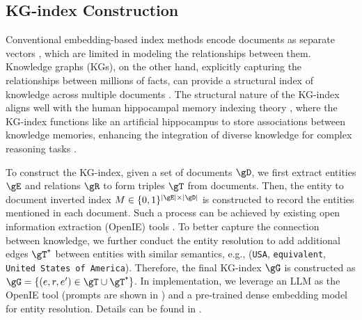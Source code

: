 

\subsection{KG-index Construction}\label{sec:kg-construction}
Conventional embedding-based index methods encode documents as separate vectors \citep{karpukhin2020dense,bge_m3,moreira2024nv}, which are limited in modeling the relationships between them. Knowledge graphs (KGs), on the other hand, explicitly capturing the relationships between millions of facts, can provide a structural index of knowledge across multiple documents \citep{edge2024local,gutiérrez2024hipporag}. The structural nature of the KG-index aligns well with the human hippocampal memory indexing theory \citep{teyler1986hippocampal}, where the KG-index functions like an artificial hippocampus to store associations between knowledge memories, enhancing the integration of diverse knowledge for complex reasoning tasks \citep{gutiérrez2024hipporag}.

To construct the KG-index, given a set of documents $\gD$, we first extract entities $\gE$ and relations $\gR$ to form triples $\gT$ from documents. Then, the entity to document inverted index $M \in \{0,1\}^{|\gE|\times|\gD|}$ is constructed to record the entities mentioned in each document. Such a process can be achieved by existing open information extraction (OpenIE) tools \citep{angeli2015leveraging,ijcai2022p793,pai2024survey}. To better capture the connection between knowledge, we further conduct the entity resolution \citep{gillick2019learning,zeakis2023pre} to add additional edges $\gT^{\texttt{+}}$ between entities with similar semantics, e.g., (\texttt{USA}, \texttt{equivalent}, \texttt{United States of America}). Therefore, the final KG-index $\gG$ is constructed as $\gG=\{(e,r,e')\in\gT\cup\gT^{\texttt{+}}\}$. In implementation, we leverage an LLM \citep{gpt4o} as the OpenIE tool (prompts are shown in ) and a pre-trained dense embedding model \citep{santhanam2022colbertv2} for entity resolution. Details can be found in .


